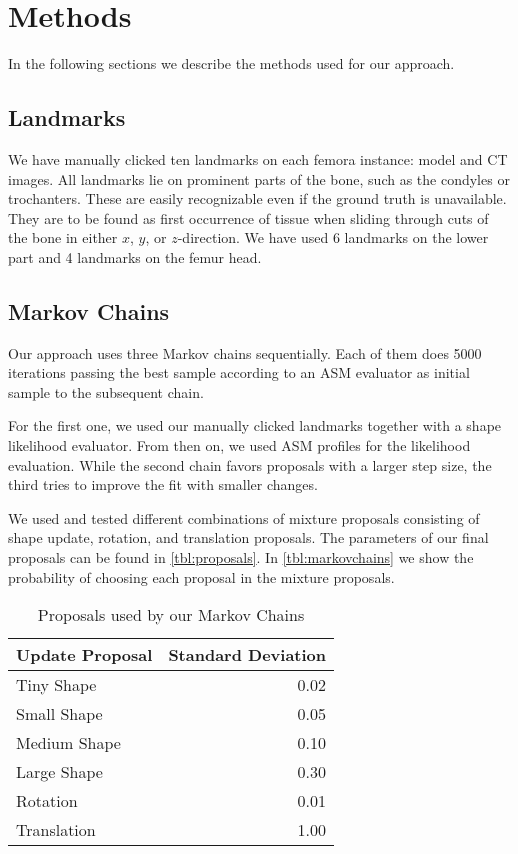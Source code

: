 \section{Methods}
\label{sec:methods}

In the following sections we describe the methods used for our approach.


\subsection{Landmarks}
\label{subsec:landmarks}

We have manually clicked ten landmarks on each femora instance: model and CT images.
All landmarks lie on prominent parts of the bone, such as the condyles or trochanters.
These are easily recognizable even if the ground truth is unavailable.
They are to be found as first occurrence of tissue when sliding through cuts of the bone in either $x$, $y$, or $z$-direction. 
We have used 6 landmarks on the lower part and 4 landmarks on the femur head.


\subsection{Markov Chains}
\label{subsec:markovchains}

Our approach uses three Markov chains sequentially. 
Each of them does 5000 iterations passing the best sample according to an ASM evaluator as initial sample to the subsequent chain.

For the first one, we used our manually clicked landmarks together with a shape likelihood evaluator.
From then on, we used ASM profiles for the likelihood evaluation.
While the second chain favors proposals with a larger step size, the third tries to improve the fit with smaller changes.

We used and tested different combinations of mixture proposals consisting of shape update, rotation, and translation proposals. 
The parameters of our final proposals can be found in \autoref{tbl:proposals}. 
In \autoref{tbl:markovchains} we show the probability of choosing each proposal in the mixture proposals.

\begin{table}
  \centering
  \caption{Proposals used by our Markov Chains}
  \label{tbl:proposals}
  \begin{tabular}{lr}
    \toprule
      \textbf{Update Proposal} &
      Standard Deviation \\
    \midrule
      Tiny Shape & 0.02 \\
      Small Shape & 0.05 \\
      Medium Shape & 0.10 \\
      Large Shape & 0.30 \\
      Rotation & 0.01 \\
      Translation & 1.00 \\
    \bottomrule
  \end{tabular}
\end{table}

